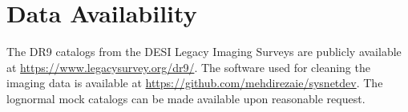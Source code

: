 \section*{Data Availability}
\label{sec:dataavail}
The DR9 catalogs from the DESI Legacy Imaging Surveys are publicly available at \href{https://www.legacysurvey.org/dr9/}{https://www.legacysurvey.org/dr9/}. The software used for cleaning the imaging data is available at \href{https://github.com/mehdirezaie/sysnetdev}{https://github.com/mehdirezaie/sysnetdev}. The lognormal mock catalogs can be made available upon reasonable request.